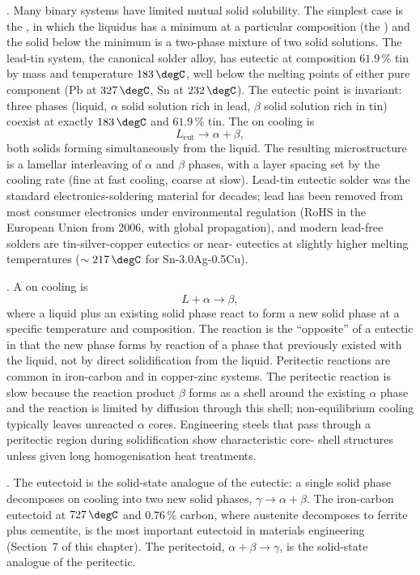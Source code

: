 . Many binary systems have limited mutual
solid solubility. The simplest case is the ,
in which the liquidus has a minimum at a particular composition (the
) and the solid below the minimum is a
two-phase mixture of two solid solutions. The lead-tin system, the
canonical solder alloy, has eutectic at composition $61.9\,\%$ tin
by mass and temperature $183\,\degC$, well below the melting points
of either pure component ($\text{Pb}$ at $327\,\degC$, $\text{Sn}$ at
$232\,\degC$). The eutectic point is invariant: three phases (liquid,
$\alpha$ solid solution rich in lead, $\beta$ solid solution rich in
tin) coexist at exactly $183\,\degC$ and $61.9\,\%$ tin. The
 on cooling is
\[
L_{\text{eut}} \to \alpha + \beta,
\]
both solids forming simultaneously from the liquid. The resulting
microstructure is a lamellar interleaving of $\alpha$ and $\beta$
phases, with a layer spacing set by the cooling rate (fine at fast
cooling, coarse at slow). Lead-tin eutectic solder was the standard
electronics-soldering material for decades; lead has been removed
from most consumer electronics under environmental regulation
(RoHS in the European Union from 2006, with global propagation), and
modern lead-free solders are tin-silver-copper eutectics or near-
eutectics at slightly higher melting temperatures ($\sim 217\,\degC$
for Sn-3.0Ag-0.5Cu).

. A  on
cooling is
\[
L + \alpha \to \beta,
\]
where a liquid plus an existing solid phase react to form a new solid
phase at a specific temperature and composition. The reaction is the
``opposite'' of a eutectic in that the new phase forms by reaction of
a phase that previously existed with the liquid, not by direct
solidification from the liquid. Peritectic reactions are common in
iron-carbon and in copper-zinc systems. The peritectic reaction is
slow because the reaction product $\beta$ forms as a shell around
the existing $\alpha$ phase and the reaction is limited by diffusion
through this shell; non-equilibrium cooling typically leaves
unreacted $\alpha$ cores. Engineering steels that pass through a
peritectic region during solidification show characteristic core-
shell structures unless given long homogenisation heat treatments.

. The eutectoid is the
solid-state analogue of the eutectic: a single solid phase decomposes
on cooling into two new solid phases, $\gamma \to \alpha + \beta$. The
iron-carbon eutectoid at $727\,\degC$ and $0.76\,\%$ carbon, where
austenite decomposes to ferrite plus cementite, is the most
important eutectoid in materials engineering (Section~7 of this
chapter). The peritectoid, $\alpha + \beta \to \gamma$, is the
solid-state analogue of the peritectic.

